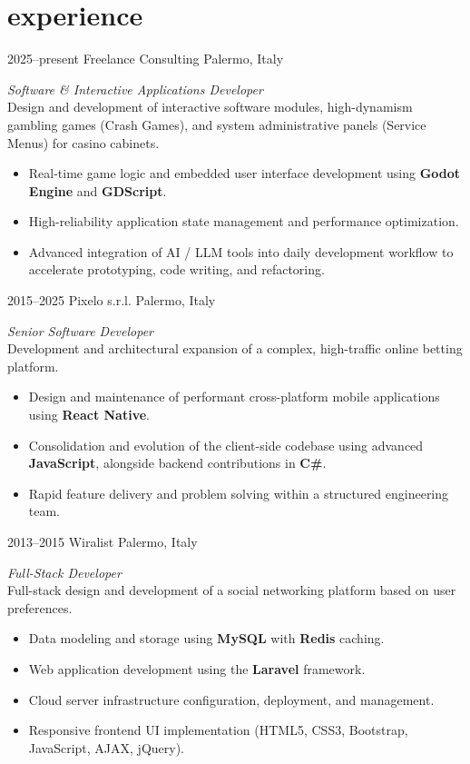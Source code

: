 \documentclass[]{friggeri-cv} %
\begin{document}
\section{experience}
\begin{entrylist}

\entry
{2025--present}
{Freelance Consulting}
{Palermo, Italy}
{\emph{Software \& Interactive Applications Developer} \\
Design and development of interactive software modules, high-dynamism gambling games (Crash Games), and system administrative panels (Service Menus) for casino cabinets.
\begin{itemize}
\item Real-time game logic and embedded user interface development using \textbf{Godot Engine} and \textbf{GDScript}.
\item High-reliability application state management and performance optimization.
\item Advanced integration of AI / LLM tools into daily development workflow to accelerate prototyping, code writing, and refactoring.
\end{itemize}
}

\entry
{2015--2025}
{Pixelo s.r.l.}
{Palermo, Italy}
{\emph{Senior Software Developer} \\
Development and architectural expansion of a complex, high-traffic online betting platform.
\begin{itemize}
\item Design and maintenance of performant cross-platform mobile applications using \textbf{React Native}.
\item Consolidation and evolution of the client-side codebase using advanced \textbf{JavaScript}, alongside backend contributions in \textbf{C\#}.
\item Rapid feature delivery and problem solving within a structured engineering team.
\end{itemize}
}

\entry
{2013--2015}
{Wiralist}
{Palermo, Italy}
{\emph{Full-Stack Developer} \\
Full-stack design and development of a social networking platform based on user preferences.
\begin{itemize}
\item Data modeling and storage using \textbf{MySQL} with \textbf{Redis} caching.
\item Web application development using the \textbf{Laravel} framework.
\item Cloud server infrastructure configuration, deployment, and management.
\item Responsive frontend UI implementation (HTML5, CSS3, Bootstrap, JavaScript, AJAX, jQuery).
\end{itemize}
}


\end{entrylist}
\end{document}
